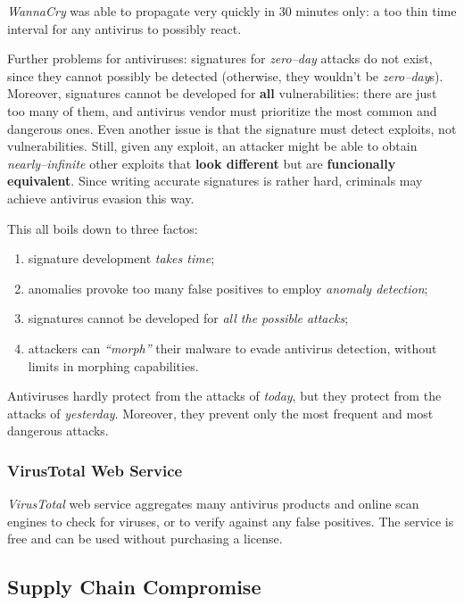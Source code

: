 \documentclass[10pt]{extbook}
\begin{document}
\emph{WannaCry} was able to propagate very quickly in 30 minutes only: a too
thin time interval for any antivirus to possibly react.

Further problems for antiviruses: signatures for \emph{zero--day} attacks do
not exist, since they cannot possibly be detected (otherwise, they wouldn't be
\emph{zero--day}s). Moreover, signatures cannot be developed for \textbf{all}
vulnerabilities: there are just too many of them, and antivirus vendor must
prioritize the most common and dangerous ones. Even another issue is that the
signature must detect exploits, not vulnerabilities. Still, given any
exploit, an attacker might be able to obtain \emph{nearly--infinite} other
exploits that \textbf{look different} but are \textbf{funcionally equivalent}.
Since writing accurate signatures is rather hard, criminals may achieve
antivirus evasion this way.

This all boils down to three factos:
\begin{enumerate}
    \item signature development \emph{takes time};
    \item anomalies provoke too many false positives to employ \emph{anomaly
        detection};
    \item signatures cannot be developed for \emph{all the possible attacks};
    \item attackers can \emph{``morph''} their malware to evade antivirus
        detection, without limits in morphing capabilities.
\end{enumerate}

Antiviruses hardly protect from the attacks of \emph{today}, but they protect
from the attacks of \emph{yesterday}. Moreover, they prevent only the most
frequent and most dangerous attacks.

\subsubsection{VirusTotal Web Service}

\emph{VirusTotal} web service aggregates many antivirus products and online
scan engines to check for viruses, or to verify against any false positives.
The service is free and can be used without purchasing a license.

\subsection{Supply Chain Compromise}
\end{document}
